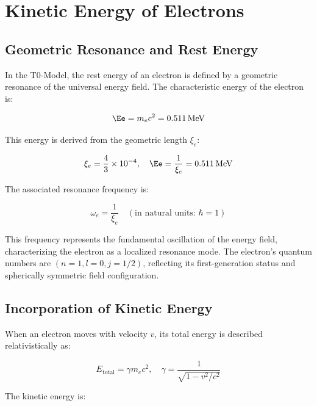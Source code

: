 \section{Kinetic Energy of Electrons}
\label{sec:electron_kinetic_energy}

\subsection{Geometric Resonance and Rest Energy}
\label{subsec:electron_rest_energy}

In the T0-Model, the rest energy of an electron is defined by a geometric resonance of the universal energy field. The characteristic energy of the electron is:

\begin{equation}
	\Ee = m_e c^2 = 0.511 \, \text{MeV}
\end{equation}

This energy is derived from the geometric length \(\xi_e\):

\begin{equation}
	\xi_e = \frac{4}{3} \times 10^{-4}, \quad \Ee = \frac{1}{\xi_e} = 0.511 \, \text{MeV}
	\label{eq:electron_energy}
\end{equation}

The associated resonance frequency is:

\begin{equation}
	\omega_e = \frac{1}{\xi_e} \quad (\text{in natural units: } \hbar = 1)
\end{equation}

This frequency represents the fundamental oscillation of the energy field, characterizing the electron as a localized resonance mode. The electron's quantum numbers are \((n=1, l=0, j=1/2)\), reflecting its first-generation status and spherically symmetric field configuration.

\subsection{Incorporation of Kinetic Energy}
\label{subsec:electron_kinetic}

When an electron moves with velocity \( v \), its total energy is described relativistically as:

\begin{equation}
	E_{\text{total}} = \gamma m_e c^2, \quad \gamma = \frac{1}{\sqrt{1 - v^2/c^2}}
\end{equation}

The kinetic energy is:


